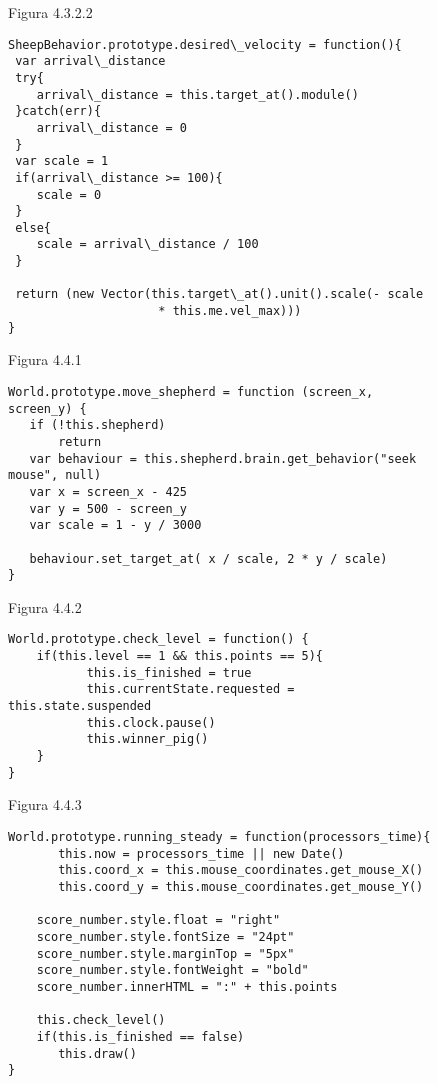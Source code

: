 \begin{figure}
Figura 4.3.2.2
\begin{verbatim}
SheepBehavior.prototype.desired\_velocity = function(){
 var arrival\_distance
 try{
    arrival\_distance = this.target_at().module()
 }catch(err){
    arrival\_distance = 0
 }
 var scale = 1
 if(arrival\_distance >= 100){
    scale = 0
 }
 else{
    scale = arrival\_distance / 100
 }

 return (new Vector(this.target\_at().unit().scale(- scale 
                     * this.me.vel_max)))
}
\end{verbatim}
\end{figure}


\begin{figure}
Figura 4.4.1
\begin{verbatim}
World.prototype.move_shepherd = function (screen_x, screen_y) {
   if (!this.shepherd)
       return
   var behaviour = this.shepherd.brain.get_behavior("seek mouse", null)
   var x = screen_x - 425
   var y = 500 - screen_y
   var scale = 1 - y / 3000

   behaviour.set_target_at( x / scale, 2 * y / scale)
}
\end{verbatim}
\end{figure}


\begin{figure}
Figura 4.4.2
\begin{verbatim}
World.prototype.check_level = function() {
    if(this.level == 1 && this.points == 5){
           this.is_finished = true
           this.currentState.requested = this.state.suspended
           this.clock.pause()
           this.winner_pig()
    }
}
\end{verbatim}
\end{figure}


\begin{figure}
Figura 4.4.3
\begin{verbatim}
World.prototype.running_steady = function(processors_time){
       this.now = processors_time || new Date()
       this.coord_x = this.mouse_coordinates.get_mouse_X()
       this.coord_y = this.mouse_coordinates.get_mouse_Y()

    score_number.style.float = "right"
    score_number.style.fontSize = "24pt"
    score_number.style.marginTop = "5px"
    score_number.style.fontWeight = "bold"
    score_number.innerHTML = ":" + this.points

    this.check_level()
    if(this.is_finished == false)
       this.draw()
}
\end{verbatim}
\end{figure}


